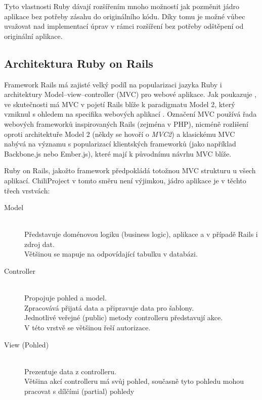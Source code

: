 \documentclass[thesis=B,czech]{FITthesis}[2012/05/02]
\begin{document}
Tyto vlastnosti Ruby dávají rozšířením mnoho možností jak pozměnit jádro
aplikace bez potřeby zásahu do originálního kódu. Díky tomu je možné
vůbec uvažovat nad implementací úprav v rámci rozšíření bez potřeby
odštěpení od originální aplikace.

\subsection{Architektura Ruby on Rails}

Framework Rails má zajisté velký podíl na popularizaci jazyka Ruby i
architektury Model--view--controller (MVC) pro webové aplikace. Jak
poukazuje \citep{Krzywda2011}, ve skutečnosti má MVC v pojetí Rails
blíže k paradigmatu Model 2, který vzniknul s ohledem na specifika
webových aplikací \citep{McCallister2004}. Označení MVC používá řada
webových frameworků inspirovaných Rails (zejména v PHP), nicméně
rozlišení oproti architektuře Model 2 (někdy se hovoří o \emph{MVC2}) a
klasickému MVC nabývá na významu s popularizací klientských frameworků
(jako například Backbone.js nebo Ember.js), které mají k původnímu
návrhu MVC blíže.

Ruby on Rails, jakožto  framework \citep[kpt. 4, Make
Opinionated Software]{Fried2009}
předpokládá totožnou MVC strukturu u všech aplikací. ChiliProject v
tomto směru není výjimkou, jádro aplikace je v těchto třech vrstvách:

\begin{description}
\item[Model] \hfill \\
Představuje doménovou logiku (business logic), aplikace a v případě Rails i zdroj dat. \hfill \\
Většinou se mapuje na odpovídající tabulku v databázi.
\item[Controller] \hfill \\
Propojuje pohled a model. \hfill \\
Zpracovává přijatá data a připravuje data pro šablony. \hfill \\
Jednotlivé veřejné (public) metody controlleru představují akce. \hfill \\
V této vrstvě se většinou řeší autorizace.
\item[View (Pohled)] \hfill \\
Prezentuje data z controlleru. \hfill \\
Většina akcí controlleru má svůj pohled, současně tyto pohledu mohou pracovat s dílčími (partial) pohledy
\end{description}
\end{document}
